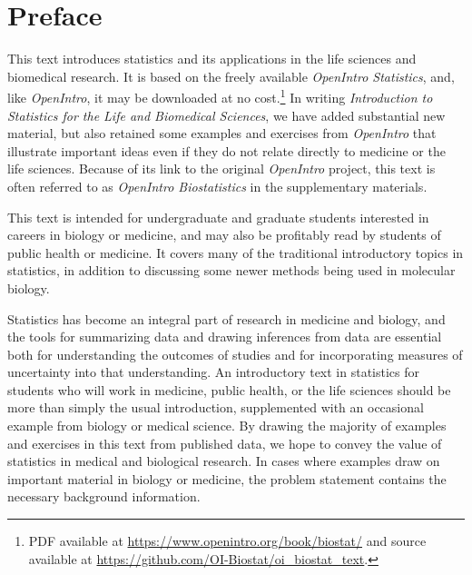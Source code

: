 \chapter*{Preface}

This text introduces statistics and its applications in the life sciences and biomedical research.  It is based on the freely available \textit{OpenIntro Statistics}, and, like \textit{OpenIntro}, it may be downloaded at no cost.\footnote{PDF available at \url{https://www.openintro.org/book/biostat/} and source available at \url{https://github.com/OI-Biostat/oi_biostat_text}.}  In writing \textit{Introduction to Statistics for the Life and Biomedical Sciences}, we have added substantial new material, but also retained some examples and exercises from \textit{OpenIntro} that illustrate important ideas even if they do not relate directly to medicine or the life sciences. Because of its link to the original \textit{OpenIntro} project, this text is often referred to as \textit{OpenIntro Biostatistics} in the supplementary materials.

This text is intended for undergraduate and graduate students interested in careers in biology or medicine, and may also be profitably read by students of public health or medicine.  It covers many of the traditional introductory topics in statistics, in addition to discussing some newer methods being used in molecular biology. 

Statistics has become an integral part of research in medicine and biology, and the tools for summarizing data and drawing inferences from data are essential both for understanding the outcomes of studies and for incorporating measures of uncertainty into that understanding.  An introductory text in statistics for students who will work in medicine, public health, or the life sciences should be more than simply the usual introduction, supplemented with an occasional example from biology or medical science. By drawing the majority of examples and exercises in this text from published data, we hope to convey the value of statistics in medical and biological research. In cases where examples draw on important material in biology or medicine, the problem statement contains the necessary background information. 

